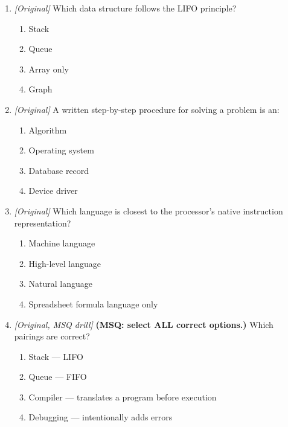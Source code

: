 \begin{enumerate}[label=\textbf{Q\arabic*.}, leftmargin=*]
\item \textit{[Original]} Which data structure follows the LIFO principle?
  \begin{enumerate}[label=\Alph*.]
\item Stack
   \item Queue
   \item Array only
   \item Graph
  \end{enumerate}

\item \textit{[Original]} A written step-by-step procedure for solving a problem is an:
  \begin{enumerate}[label=\Alph*.]
\item Algorithm
   \item Operating system
   \item Database record
   \item Device driver
  \end{enumerate}

\item \textit{[Original]} Which language is closest to the processor's native instruction representation?
  \begin{enumerate}[label=\Alph*.]
\item Machine language
   \item High-level language
   \item Natural language
   \item Spreadsheet formula language only
  \end{enumerate}

\item \textit{[Original, MSQ drill]} \textbf{(MSQ: select ALL correct options.)} Which pairings are correct?
  \begin{enumerate}[label=\Alph*.]
\item Stack --- LIFO
   \item Queue --- FIFO
   \item Compiler --- translates a program before execution
   \item Debugging --- intentionally adds errors
  \end{enumerate}

\end{enumerate}
